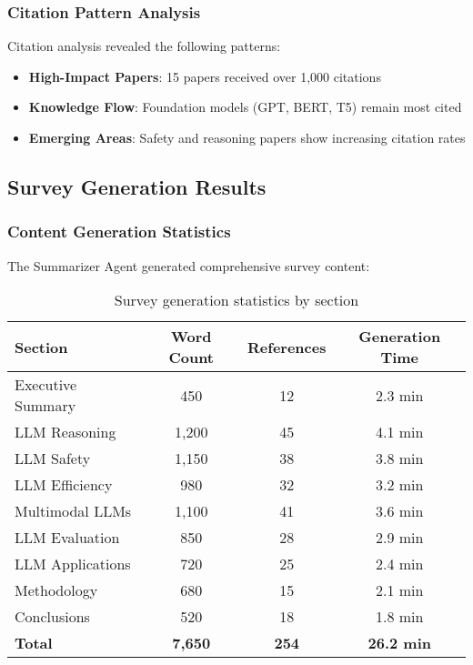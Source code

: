 \subsubsection{Citation Pattern Analysis}

Citation analysis revealed the following patterns:

\begin{itemize}
    \item \textbf{High-Impact Papers}: 15 papers received over 1,000 citations
    \item \textbf{Knowledge Flow}: Foundation models (GPT, BERT, T5) remain most cited
    \item \textbf{Emerging Areas}: Safety and reasoning papers show increasing citation rates
\end{itemize}

\subsection{Survey Generation Results}

\subsubsection{Content Generation Statistics}

The Summarizer Agent generated comprehensive survey content:

\begin{table}[H]
\centering
\begin{tabular}{|l|c|c|c|}
\hline
\textbf{Section} & \textbf{Word Count} & \textbf{References} & \textbf{Generation Time} \\
\hline
Executive Summary & 450 & 12 & 2.3 min \\
LLM Reasoning & 1,200 & 45 & 4.1 min \\
LLM Safety & 1,150 & 38 & 3.8 min \\
LLM Efficiency & 980 & 32 & 3.2 min \\
Multimodal LLMs & 1,100 & 41 & 3.6 min \\
LLM Evaluation & 850 & 28 & 2.9 min \\
LLM Applications & 720 & 25 & 2.4 min \\
Methodology & 680 & 15 & 2.1 min \\
Conclusions & 520 & 18 & 1.8 min \\
\hline
\textbf{Total} & \textbf{7,650} & \textbf{254} & \textbf{26.2 min} \\
\hline
\end{tabular}
\caption{Survey generation statistics by section}
\label{tab:generation_stats}
\end{table}

